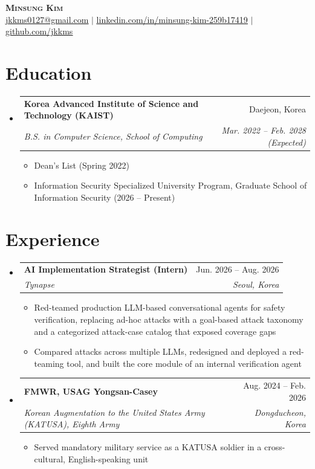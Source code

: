 \documentclass[letterpaper,11pt]{article}
\makeatletter
\newcommand{\resumeItem}[1]{
  \item\small{
    {#1 \vspace{-2pt}}
  }
}
\newcommand{\resumeSubheading}[4]{
  \vspace{-2pt}\item
    \begin{tabular*}{0.97\textwidth}[t]{l@{\extracolsep{\fill}}r}
      \textbf{#1} & #2 \\
      \textit{\small#3} & \textit{\small #4} \\
    \end{tabular*}\vspace{-7pt}
}
\newcommand{\resumeSubHeadingListStart}{\begin{itemize}[leftmargin=0.15in, label={}]}
\newcommand{\resumeSubHeadingListEnd}{\end{itemize}}
\newcommand{\resumeItemListStart}{\begin{itemize}}
\newcommand{\resumeItemListEnd}{\end{itemize}\vspace{-5pt}}
\makeatother
\begin{document}
\begin{center}
    \textbf{\Huge \scshape Minsung Kim} \\ \vspace{1pt}
    \small \href{mailto:jkkms0127@gmail.com}{\underline{jkkms0127@gmail.com}} $|$
    \href{https://www.linkedin.com/in/minsung-kim-259b17419/}{\underline{linkedin.com/in/minsung-kim-259b17419}} $|$
    \href{https://github.com/jkkms}{\underline{github.com/jkkms}}
\end{center}


\section{Education}
  \resumeSubHeadingListStart
    \resumeSubheading
      {Korea Advanced Institute of Science and Technology (KAIST)}{Daejeon, Korea}
      {B.S. in Computer Science, School of Computing}{Mar. 2022 -- Feb. 2028 (Expected)}
      \resumeItemListStart
        \resumeItem{Dean's List (Spring 2022)}
        \resumeItem{Information Security Specialized University Program, Graduate School of Information Security (2026 -- Present)}
      \resumeItemListEnd
  \resumeSubHeadingListEnd


\section{Experience}
  \resumeSubHeadingListStart

    \resumeSubheading
      {AI Implementation Strategist (Intern)}{Jun. 2026 -- Aug. 2026}
      {Tynapse}{Seoul, Korea}
      \resumeItemListStart
        \resumeItem{Red-teamed production LLM-based conversational agents for safety verification, replacing ad-hoc attacks with a goal-based attack taxonomy and a categorized attack-case catalog that exposed coverage gaps}
        \resumeItem{Compared attacks across multiple LLMs, redesigned and deployed a red-teaming tool, and built the core module of an internal verification agent}
      \resumeItemListEnd

    \resumeSubheading
      {FMWR, USAG Yongsan-Casey}{Aug. 2024 -- Feb. 2026}
      {Korean Augmentation to the United States Army (KATUSA), Eighth Army}{Dongducheon, Korea}
      \resumeItemListStart
        \resumeItem{Served mandatory military service as a KATUSA soldier in a cross-cultural, English-speaking unit}
      \resumeItemListEnd

  \resumeSubHeadingListEnd
\end{document}
